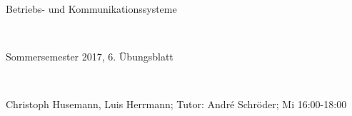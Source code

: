 \documentclass[numbers=noendperiod]{scrartcl}
\begin{document}
	
	\setlength{\parindent}{0em} 
	
	\newcommand{\inputmintedframed}[2]{
		\begin{mdframed}[linecolor=bg,backgroundcolor=bg]
			\inputminted[mathescape,breaklines,linenos,numbersep=5pt,tabsize=3]{#1}{#2}
	\end{mdframed}}
	
	\hrulefill
	\begin{center}
		\bfseries %
		\sffamily %
		\begin{huge}
			Betriebs- und Kommunikationssysteme
		\end{huge}\\
		\begin{Large}
			Sommersemester 2017, 6. Übungsblatt
		\end{Large}\\
		\begin{small}
			Christoph Husemann, Luis Herrmann; Tutor: André Schröder; Mi 16:00-18:00
		\end{small}
		
		\vspace{-10pt}
	\end{center}
	\hrulefill
	
\end{document}

